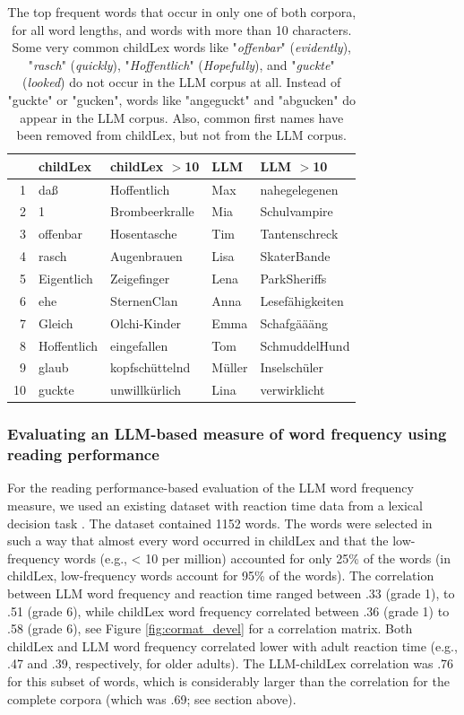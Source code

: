 \documentclass[doc, a4paper]{apa7}
\begin{document}
\begin{table}[!htbp]
\caption{The top frequent words that occur in only one of both corpora, for all word lengths, and words with more than 10 characters. Some very common childLex words like "\textit{offenbar}" (\textit{evidently}), "\textit{rasch}" (\textit{quickly}), "\textit{Hoffentlich}" (\textit{Hopefully}), and "\textit{guckte}" (\textit{looked}) do not occur in the LLM corpus at all. Instead of "guckte" or "gucken", words like "angeguckt" and "abgucken" do appear in the LLM corpus. Also, common first names have been removed from childLex, but not from the LLM corpus.}
\centering
\begin{tabular}{rllll}
  \hline
 & childLex & childLex $>$10 & LLM & LLM $>$10 \\ 
  \hline
1 & daß & Hoffentlich & Max & nahegelegenen \\ 
  2 & 1 & Brombeerkralle & Mia & Schulvampire \\ 
  3 & offenbar & Hosentasche & Tim & Tantenschreck \\ 
  4 & rasch & Augenbrauen & Lisa & SkaterBande \\ 
  5 & Eigentlich & Zeigefinger & Lena & ParkSheriffs \\ 
  6 & ehe & SternenClan & Anna & Lesefähigkeiten \\ 
  7 & Gleich & Olchi-Kinder & Emma & Schafgäääng \\ 
  8 & Hoffentlich & eingefallen & Tom & SchmuddelHund \\ 
  9 & glaub & kopfschüttelnd & Müller & Inselschüler \\ 
  10 & guckte & unwillkürlich & Lina & verwirklicht \\ 
   \hline
\end{tabular}
\label{notin}
\end{table}


\subsubsection*{Evaluating an LLM-based measure of word frequency using reading performance}

For the reading performance-based evaluation of the LLM word frequency measure, we used an existing dataset with reaction time data from a lexical decision task \citep{schroter_developmental_2017}. The dataset contained 1152 words. The words were selected in such a way that almost every word occurred in childLex and that the low-frequency words (e.g., < 10 per million) accounted for only 25\% of the words (in childLex, low-frequency words account for 95\% of the words). The correlation between LLM word frequency and reaction time ranged between .33 (grade 1), to .51 (grade 6), while childLex word frequency correlated between .36 (grade 1) to .58 (grade 6), see Figure \ref{fig:cormat_devel} for a correlation matrix. Both childLex and LLM word frequency correlated lower with adult reaction time (e.g., .47 and .39, respectively, for older adults). The LLM-childLex correlation was .76 for this subset of words, which is considerably larger than the correlation for the complete corpora (which was .69; see section above). 
\end{document}
